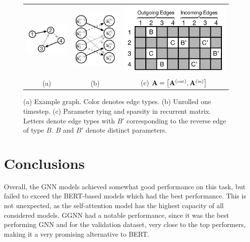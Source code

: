 \documentclass{article}
\begin{document}
\begin{figure}[t]
\begin{center}
\begin{tabular}{ccc}
\includegraphics[width=.25 \columnwidth]{figs/example-graph.pdf} &
\includegraphics[width=.18 \columnwidth]{figs/unrolled-graph3.pdf} &
\includegraphics[width=.32 \columnwidth]{figs/recurrent-matrix-sparsity-pattern2.pdf}
\\
(a) & (b) & (c) $\Av = \left[ \Av^{(\hbox{\tiny{out}})},  \Av^{(\hbox{\tiny{in}})} \right]$
\end{tabular}
\end{center}
\vspace{-10pt}
\caption{
  (a) Example graph. Color denotes edge types.
  (b) Unrolled one timestep.
  (c) Parameter tying and sparsity in recurrent matrix. Letters denote
  edge types with $B'$ corresponding to the reverse edge of type $B$.
  $B$ and $B'$ denote distinct parameters.
}
\label{fig:graphs-and-sparsity}
\end{figure}


\section{Conclusions}
Overall, the GNN models achieved somewhat good performance on this task, but failed to exceed the BERT-based models which had the best performance. This is not unexpected, as the self-attention model has the highest capacity of all considered models. GGNN had a notable performance, since it was the best performing GNN and for the validation dataset, very close to the top performers, making it a very promising alternative to BERT.
\end{document}
